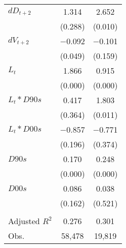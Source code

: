 {\begin{longtable}{l*{2}{c}}
\addlinespace
$ dD_{t+2}$ &       1.314&       2.652\\
&     (0.288)&     (0.010)\\
\addlinespace
$ dV_{t+2}$ &    $-$0.092&    $-$0.101\\
&     (0.049)&     (0.159)\\
\addlinespace
$ L_{t}$    &       1.866&       0.915\\
&     (0.000)&     (0.000)\\
\addlinespace
$ L_{t} * D90s$&       0.417&       1.803\\
&     (0.364)&     (0.011)\\
\addlinespace
$ L_{t} * D00s$&    $-$0.857&    $-$0.771\\
&     (0.196)&     (0.374)\\
\addlinespace
$ D90s$     &       0.170&       0.248\\
&     (0.000)&     (0.000)\\
\addlinespace
$ D00s$     &       0.086&       0.038\\
&     (0.162)&     (0.521)\\
\\
Adjusted $ R^{2}$&       0.276&       0.301\\
Obs.        &      58,478&      19,819\\
\bottomrule
\end{longtable}
}
